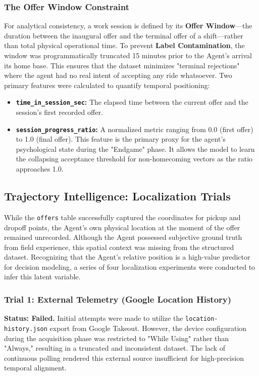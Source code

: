 \subsubsection{The Offer Window Constraint}
For analytical consistency, a work session is defined by its \textbf{Offer Window}—the duration between the inaugural offer and the terminal offer of a shift—rather than total physical operational time. To prevent \textbf{Label Contamination}, the window was programmatically truncated 15 minutes prior to the Agent’s arrival its home base. This ensures that the dataset minimizes "terminal rejections" where the agent had no real intent of accepting any ride whatsoever. Two primary features were calculated to quantify temporal positioning:
\begin{itemize}
    \item \textbf{\texttt{time\_in\_session\_sec}:} The elapsed time between the current offer and the session's first recorded offer.
    \item \textbf{\texttt{session\_progress\_ratio}:} A normalized metric ranging from 0.0 (first offer) to 1.0 (final offer). This feature is the primary proxy for the agent's psychological state during the "Endgame" phase. It allows the model to learn the collapsing acceptance threshold for non-homecoming vectors as the ratio approaches 1.0.
\end{itemize}


\subsection{Trajectory Intelligence: Localization Trials}
While the \texttt{offers} table successfully captured the coordinates for pickup and dropoff points, the Agent’s own physical location at the moment of the offer remained unrecorded. Although the Agent possessed subjective ground truth from field experience, this spatial context was missing from the structured dataset. Recognizing that the Agent's relative position is a high-value predictor for decision modeling, a series of four localization experiments were conducted to infer this latent variable.

\subsubsection{Trial 1: External Telemetry (Google Location History)}
\textbf{Status: Failed.} Initial attempts were made to utilize the \texttt{location-history.json} export from Google Takeout. However, the device configuration during the acquisition phase was restricted to "While Using" rather than "Always," resulting in a truncated and inconsistent dataset. The lack of continuous polling rendered this external source insufficient for high-precision temporal alignment.

